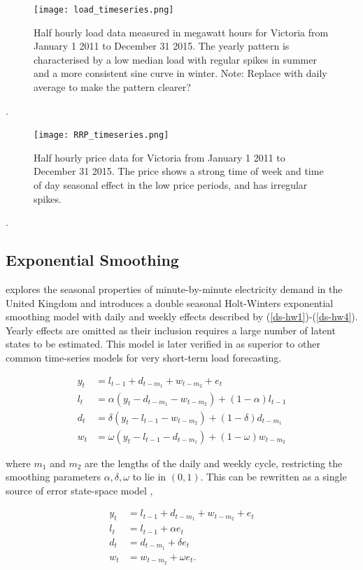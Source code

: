 \documentclass[12pt,a4paper]{article}%
\numberwithin{equation}{section}
\begin{document}
\begin{figure}[h]
\centering
\texttt{[image: load\_timeseries.png]}
\caption{Half hourly load data measured in megawatt hours for Victoria from January 1 2011 to December 31 2015. The yearly pattern is characterised by a low median load with regular spikes in summer and a more consistent sine curve in winter. Note: Replace with daily average to make the pattern clearer?}
\label{loadplot}
\end{figure}.

\begin{figure}[h]
\centering
\texttt{[image: RRP\_timeseries.png]}
\caption{Half hourly price data for Victoria from January 1 2011 to December 31 2015. The price shows a strong time of week and time of day seasonal effect in the low price periods, and has irregular spikes.}
\label{rrpplot}
\end{figure}.

\subsection{Exponential Smoothing}

\citet{Taylor2003} explores the seasonal properties of minute-by-minute electricity demand in the United Kingdom and introduces a double seasonal Holt-Winters exponential smoothing model with daily and weekly effects described by (\ref{ds-hw1})-(\ref{ds-hw4}). Yearly effects are omitted as their inclusion requires a large number of latent states to be estimated. This model is later verified in \citet{Taylor2008} as superior to other common time-series models for very short-term load forecasting.

\begin{align}
y_t &= l_{t-1} + d_{t-m_1} + w_{t-m_2} + e_t \label{ds-hw1} \\
l_t &= \alpha (y_t - d_{t-m_1} - w_{t-m_2}) + (1 - \alpha)l_{t-1} \label{ds-hw2}\\
d_t &= \delta (y_t - l_{t-1} - w_{t-m_2}) + (1 - \delta)d_{t-m_1} \label{ds-hw3} \\
w_t &= \omega (y_t - l_{t-1} - d_{t-m_1}) + (1 - \omega)w_{t-m_2} \label{ds-hw4}
\end{align}

where $m_1$ and $m_2$ are the lengths of the daily and weekly cycle, restricting the smoothing parameters $\alpha, \delta, \omega$ to lie in $(0, 1)$. This can be rewritten as a single source of error state-space model \citep{Snyder1985},

\begin{align}
y_t &= l_{t-1} + d_{t-m_1} + w_{t-m_2} + e_t \label{ds-hw-ssoe1} \\
l_t &= l_{t-1} + \alpha e_t \label{ds-hw-ssoe2} \\
d_t &= d_{t-m_1} + \delta e_t \label{ds-hw-ssoe3} \\
w_t &= w_{t-m_2} + \omega e_t \label{ds-hw-ssoe4}. 
\end{align}
\end{document}
